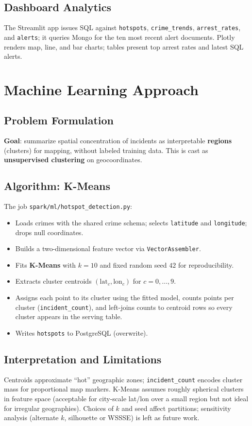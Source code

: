 \documentclass[12pt,a4paper]{article}
\begin{document}
\subsection{Dashboard Analytics}
The Streamlit app issues SQL against \texttt{hotspots}, \texttt{crime\_trends}, \texttt{arrest\_rates}, and \texttt{alerts}; it queries Mongo for the ten most recent alert documents. Plotly renders map, line, and bar charts; tables present top arrest rates and latest SQL alerts.

\section{Machine Learning Approach}
\label{sec:ml}

\subsection{Problem Formulation}
\textbf{Goal}: summarize spatial concentration of incidents as interpretable \textbf{regions} (clusters) for mapping, without labeled training data. This is cast as \textbf{unsupervised clustering} on geocoordinates.

\subsection{Algorithm: K-Means}
The job \texttt{spark/ml/hotspot\_detection.py}:
\begin{itemize}
    \item Loads crimes with the shared crime schema; selects \texttt{latitude} and \texttt{longitude}; drops null coordinates.
    \item Builds a two-dimensional feature vector via \texttt{VectorAssembler}.
    \item Fits \textbf{K-Means} with $k=10$ and fixed random seed $42$ for reproducibility.
    \item Extracts cluster centroids $(\text{lat}_c, \text{lon}_c)$ for $c=0,\ldots,9$.
    \item Assigns each point to its cluster using the fitted model, counts points per cluster (\texttt{incident\_count}), and left-joins counts to centroid rows so every cluster appears in the serving table.
    \item Writes \texttt{hotspots} to PostgreSQL (overwrite).
\end{itemize}

\subsection{Interpretation and Limitations}
Centroids approximate ``hot'' geographic zones; \texttt{incident\_count} encodes cluster mass for proportional map markers. K-Means assumes roughly spherical clusters in feature space (acceptable for city-scale lat/lon over a small region but not ideal for irregular geographies). Choices of $k$ and seed affect partitions; sensitivity analysis (alternate $k$, silhouette or WSSSE) is left as future work.
\end{document}
